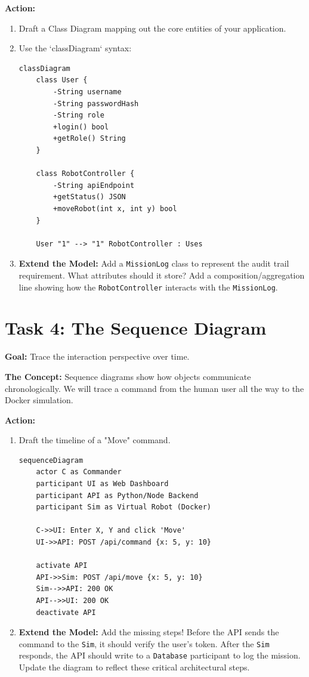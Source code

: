 \documentclass[a4paper,12pt]{article}
\begin{document}
\vspace{0.3cm}
\textbf{Action:}
\begin{enumerate}
    \item Draft a Class Diagram mapping out the core entities of your application.
    \item Use the `classDiagram` syntax:
    \begin{verbatim}
classDiagram
    class User {
        -String username
        -String passwordHash
        -String role
        +login() bool
        +getRole() String
    }

    class RobotController {
        -String apiEndpoint
        +getStatus() JSON
        +moveRobot(int x, int y) bool
    }
    
    User "1" --> "1" RobotController : Uses
    \end{verbatim}
    \item \textbf{Extend the Model:} Add a \texttt{MissionLog} class to represent the audit trail requirement. What attributes should it store? Add a composition/aggregation line showing how the \texttt{RobotController} interacts with the \texttt{MissionLog}.
\end{enumerate}


\section*{Task 4: The Sequence Diagram}

\textbf{Goal:} Trace the interaction perspective over time.

\textbf{The Concept:} Sequence diagrams show how objects communicate chronologically. We will trace a command from the human user all the way to the Docker simulation.

\vspace{0.3cm}
\textbf{Action:}
\begin{enumerate}
    \item Draft the timeline of a "Move" command.
    \begin{verbatim}
sequenceDiagram
    actor C as Commander
    participant UI as Web Dashboard
    participant API as Python/Node Backend
    participant Sim as Virtual Robot (Docker)

    C->>UI: Enter X, Y and click 'Move'
    UI->>API: POST /api/command {x: 5, y: 10}
    
    activate API
    API->>Sim: POST /api/move {x: 5, y: 10}
    Sim-->>API: 200 OK
    API-->>UI: 200 OK
    deactivate API
    \end{verbatim}
    \item \textbf{Extend the Model:} Add the missing steps! Before the API sends the command to the \texttt{Sim}, it should verify the user's token. After the \texttt{Sim} responds, the API should write to a \texttt{Database} participant to log the mission. Update the diagram to reflect these critical architectural steps.
\end{enumerate}
\end{document}
